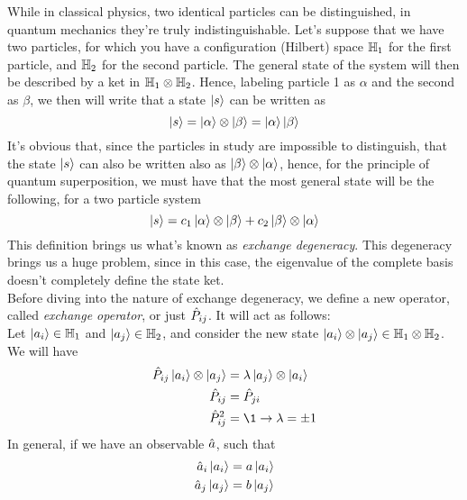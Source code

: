 \documentclass[../qm.tex]{subfiles}
\begin{document}
	While in classical physics, two identical particles can be distinguished, in quantum mechanics they're truly indistinguishable. Let's suppose that we have two particles, for which you have a configuration (Hilbert) space $\mathbb{H}_1$ for the first particle, and $\mathbb{H}_2$ for the second particle. The general state of the system will then be described by a ket in $\mathbb{H}_1\otimes\mathbb{H}_2$. Hence, labeling particle 1 as $\alpha$ and the second as $\beta$, we then will write that a state $\ket{s}$ can be written as
	\begin{equation}
		\ket{s}=\ket{\alpha}\otimes\ket{\beta}=\ket{\alpha}\ket{\beta}
		\label{eq:generalstate2part}
	\end{equation}
	It's obvious that, since the particles in study are impossible to distinguish, that the state $\ket{s}$ can also be written also as $\ket{\beta}\otimes\ket{\alpha}$, hence, for the principle of quantum superposition, we must have that the most general state will be the following, for a two particle system
	\begin{equation}
		\ket{s}=c_1\ket{\alpha}\otimes\ket{\beta}+c_2\ket{\beta}\otimes\ket{\alpha}
		\label{eq:mostgeneral2partstate}
	\end{equation}
	This definition brings us what's known as \textit{exchange degeneracy}. This degeneracy brings us a huge problem, since in this case, the eigenvalue of the complete basis doesn't completely define the state ket.\\
	Before diving into the nature of exchange degeneracy, we define a new operator, called \textit{exchange operator}, or just $\hat{P}_{ij}$. It will act as follows:\\
	Let $\ket{a_i}\in\mathbb{H}_1$ and $\ket{a_j}\in\mathbb{H}_2$, and consider the new state $\ket{a_i}\otimes\ket{a_j}\in\mathbb{H}_1\otimes\mathbb{H}_2$. We will have
	\begin{equation*}
		\begin{aligned}
			\opr{P}_{ij}\ket{a_i}\otimes\ket{a_j}&=\lambda\ket{a_j}\otimes\ket{a_i}\\
			\opr{P}_{ij}&=\opr{P}_{ji}\\
			\opr{P}_{ij}^2&=\1\to\lambda=\pm1
		\end{aligned}
	\end{equation*}
	In general, if we have an observable $\hat{a}$, such that
	\begin{equation*}
		\begin{aligned}
			\hat{a}_i\ket{a_i}&=a\ket{a_i}\\
			\hat{a}_j\ket{a_j}&=b\ket{a_j}
		\end{aligned}
	\end{equation*}
\end{document}
